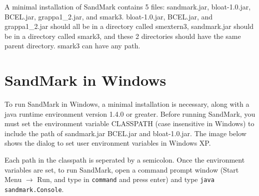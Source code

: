 A minimal installation of SandMark contains 5 files:
sandmark.jar, bloat-1.0.jar, BCEL.jar, grappa1\_2.jar, 
and smark3.  bloat-1.0.jar, BCEL.jar, and grappa1\_2.jar
should all be in a directory called smextern3, sandmark.jar
should be in a directory called smark3, and these 2 
directories should have the same parent directory.  smark3
can have any path.

\section{SandMark in Windows}
To run SandMark in Windows, a minimal installation is necessary, along
with a java runtime environment version 1.4.0 or greater.  Before running
SandMark, you must set the environment variable CLASSPATH (case insensitive
in Windows) to include the path of sandmark.jar BCEL.jar and bloat-1.0.jar.
The image below shows the dialog to set user environment variables in
Windows XP.


Each path in the classpath is seperated by a semicolon.  Once the 
environment variables are set, to run SandMark, open a command 
prompt window (Start Menu $\rightarrow$ Run, and type in \verb/command/ and
press enter) and type \verb/java sandmark.Console/.
